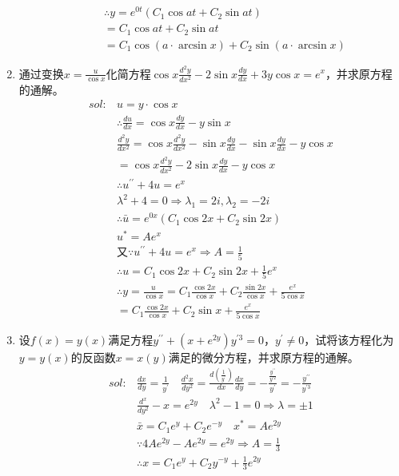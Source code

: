 \begin{enumerate}[{例}1.]
\begin{enumerate}[(1)]
\begin{align*}
                    &\therefore y=e^{0t}(C_1\cos at+C_2\sin at)\\
                    &=C_1\cos at+C_2\sin at\\
                    &=C_1\cos (a\cdot\arcsin x)+C_2\sin (a\cdot\arcsin x)
                \end{align*}
        \end{enumerate}
    \item 通过变换$x=\frac{u}{\cos x}$化简方程$\cos x \frac{d^2 y}{d x^2}-2\sin x \frac{dy}{dx}+3y \cos x=e^x$，并求原方程的通解。
        \begin{align*}
            sol:&u=y\cdot\cos x\\
                &\therefore \frac{du}{dx}=\cos x\frac{dy}{dx}-y\sin x\\
                &\frac{d^2y}{dx^2}=\cos x\frac{d^2y}{dx^2}-\sin x\frac{dy}{dx}-\sin x\frac{dy}{dx}-y\cos x\\
                &=\cos x\frac{d^2y}{dx^2}-2\sin x\frac{dy}{dx}-y\cos x\\
                &\therefore u^{\prime\prime}+4u=e^x\\
                &\lambda^2+4=0\Rightarrow\lambda_1=2i,\lambda_2=-2i\\
                &\therefore \bar{u}=e^{0x}(C_1\cos 2x+C_2\sin 2x)\\
                &u^*=Ae^x\\
                &\mbox{又}\because u^{\prime\prime}+4u=e^x\Rightarrow A=\frac{1}{5}\\
                &\therefore u=C_1\cos 2x+C_2\sin 2x+\frac{1}{5}e^x\\
                &\therefore y=\frac{u}{\cos x}=C_1\frac{\cos 2x}{\cos x}+C_2\frac{\sin 2x}{\cos x}+\frac{e^x}{5\cos x}\\
                &=C_1\frac{\cos 2x}{\cos x}+C_2\sin x+\frac{e^x}{5\cos x}
        \end{align*}
    \item 设$f(x)=y(x)$满足方程$y^{\prime\prime}+(x+e^{2y})y^{\prime 3}=0$，$y^{\prime}\neq 0$，试将该方程化为$y=y(x)$的反函数$x=x(y)$满足的微分方程，并求原方程的通解。
        \begin{align*}
            sol:&\frac{dx}{dy}=\frac{1}{y^{\prime}}\quad\frac{d^2x}{dy^2}=\frac{d(\frac{1}{y^{\prime}})}{dx}\frac{dx}{dy}=-\frac{\frac{y^{\prime\prime}}{y^{\prime 2}}}{y^{\prime}}=-\frac{y^{\prime\prime}}{y^{\prime 3}}\\
                &\frac{d^x}{dy^2}-x=e^{2y}\quad\lambda^2-1=0\Rightarrow\lambda=\pm 1\\
                &\bar{x}=C_1e^y+C_2e^{-y}\quad x^*=Ae^{2y}\\
                &\because 4Ae^{2y}-Ae^{2y}=e^{2y}\Rightarrow A=\frac{1}{3}\\
                &\therefore x=C_1e^y+C_2y^{-y}+\frac{1}{3}e^{2y}
        \end{align*}
\end{enumerate}
